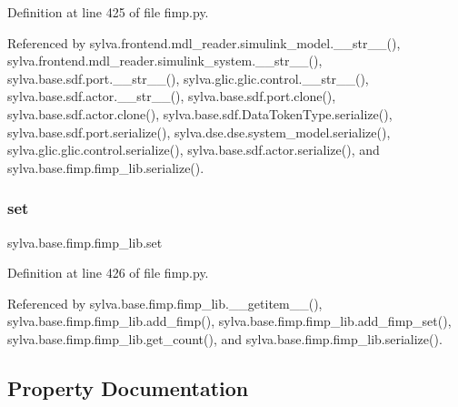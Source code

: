 Definition at line 425 of file fimp.\+py.



Referenced by sylva.\+frontend.\+mdl\+\_\+reader.\+simulink\+\_\+model.\+\_\+\+\_\+str\+\_\+\+\_\+(), sylva.\+frontend.\+mdl\+\_\+reader.\+simulink\+\_\+system.\+\_\+\+\_\+str\+\_\+\+\_\+(), sylva.\+base.\+sdf.\+port.\+\_\+\+\_\+str\+\_\+\+\_\+(), sylva.\+glic.\+glic.\+control.\+\_\+\+\_\+str\+\_\+\+\_\+(), sylva.\+base.\+sdf.\+actor.\+\_\+\+\_\+str\+\_\+\+\_\+(), sylva.\+base.\+sdf.\+port.\+clone(), sylva.\+base.\+sdf.\+actor.\+clone(), sylva.\+base.\+sdf.\+Data\+Token\+Type.\+serialize(), sylva.\+base.\+sdf.\+port.\+serialize(), sylva.\+dse.\+dse.\+system\+\_\+model.\+serialize(), sylva.\+glic.\+glic.\+control.\+serialize(), sylva.\+base.\+sdf.\+actor.\+serialize(), and sylva.\+base.\+fimp.\+fimp\+\_\+lib.\+serialize().

\mbox{\label{classsylva_1_1base_1_1fimp_1_1fimp__lib_a6d2f4a5c592b6fc32418dc27129326ac}} 
\subsubsection{\texorpdfstring{set}{set}}
{\footnotesize\ttfamily sylva.\+base.\+fimp.\+fimp\+\_\+lib.\+set}



Definition at line 426 of file fimp.\+py.



Referenced by sylva.\+base.\+fimp.\+fimp\+\_\+lib.\+\_\+\+\_\+getitem\+\_\+\+\_\+(), sylva.\+base.\+fimp.\+fimp\+\_\+lib.\+add\+\_\+fimp(), sylva.\+base.\+fimp.\+fimp\+\_\+lib.\+add\+\_\+fimp\+\_\+set(), sylva.\+base.\+fimp.\+fimp\+\_\+lib.\+get\+\_\+count(), and sylva.\+base.\+fimp.\+fimp\+\_\+lib.\+serialize().



\subsection{Property Documentation}
\mbox{\label{classsylva_1_1base_1_1fimp_1_1fimp__lib_a35e572d841ddc8a2f4ea44fdf823e92d}} 
